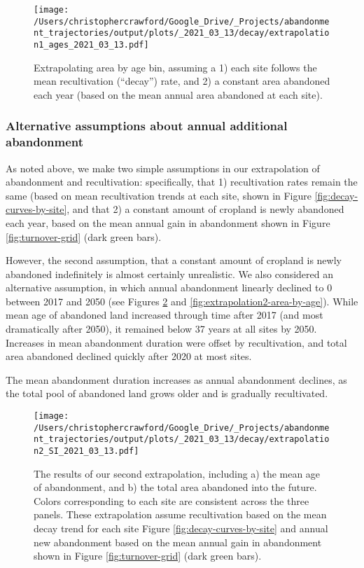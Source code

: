 \documentclass[9pt,twoside,lineno]{pnas-new}
\begin{document}
\begin{figure}
\centering
\texttt{[image: /Users/christophercrawford/Google\_Drive/\_Projects/abandonment\_trajectories/output/plots/\_2021\_03\_13/decay/extrapolation1\_ages\_2021\_03\_13.pdf]}
\caption{\label{fig:extrapolation-area-by-age}Extrapolating area by age bin, assuming a 1) each site follows the mean recultivation (``decay'') rate, and 2) a constant area abandoned each year (based on the mean annual area abandoned at each site).}
\end{figure}

\hypertarget{alternative-assumptions-about-annual-additional-abandonment}{%
\subsubsection{Alternative assumptions about annual additional abandonment}\label{alternative-assumptions-about-annual-additional-abandonment}}

As noted above, we make two simple assumptions in our extrapolation of abandonment and recultivation: specifically, that 1) recultivation rates remain the same (based on mean recultivation trends at each site, shown in Figure \ref{fig:decay-curves-by-site}, and that 2) a constant amount of cropland is newly abandoned each year, based on the mean annual gain in abandonment shown in Figure \ref{fig:turnover-grid} (dark green bars).

However, the second assumption, that a constant amount of cropland is newly abandoned indefinitely is almost certainly unrealistic.
We also considered an alternative assumption, in which annual abandonment linearly declined to 0 between 2017 and 2050 (see Figures \ref{fig:extrapolation2-combo} and \ref{fig:extrapolation2-area-by-age}).
While mean age of abandoned land increased through time after 2017 (and most dramatically after 2050), it remained below 37 years at all sites by 2050.
Increases in mean abandonment duration were offset by recultivation, and total area abandoned declined quickly after 2020 at most sites.

The mean abandonment duration increases as annual abandonment declines, as the total pool of abandoned land grows older and is gradually recultivated.



\begin{figure}
\centering
\texttt{[image: /Users/christophercrawford/Google\_Drive/\_Projects/abandonment\_trajectories/output/plots/\_2021\_03\_13/decay/extrapolation2\_SI\_2021\_03\_13.pdf]}
\caption{\label{fig:extrapolation2-combo}The results of our second extrapolation, including a) the mean age of abandonment, and b) the total area abandoned into the future. Colors corresponding to each site are consistent across the three panels. These extrapolation assume recultivation based on the mean decay trend for each site Figure \ref{fig:decay-curves-by-site} and annual new abandonment based on the mean annual gain in abandonment shown in Figure \ref{fig:turnover-grid} (dark green bars).}
\end{figure}
\end{document}
